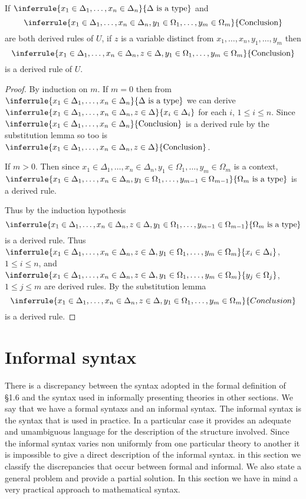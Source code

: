 \begin{lemma}[4]
If $\inferrule{x_1\in\Delta_1,\ldots,x_n\in\Delta_n}{\Delta\isatype}$ and 
\[\inferrule{x_1\in\Delta_1,\ldots,x_n\in\Delta_n,y_1\in\Omega_1,\ldots,y_m\in\Omega_m}{\text{Conclusion}}\] are both derived rules of $U$, if $z$ is a variable distinct from $x_1,\ldots,x_n,y_1,\ldots,y_m$ then 
\[\inferrule{x_1\in\Delta_1,\ldots,x_n\in\Delta_n,z\in\Delta,y_1\in\Omega_1,\ldots,y_m\in\Omega_m}{\text{Conclusion}}\] is a derived rule of $U$.
\end{lemma}
\begin{proof}
  By induction on $m$.
  If $m=0$ then from $\inferrule{x_1\in\Delta_1,\ldots,x_n\in\Delta_n}{\Delta\isatype}$ we can derive $\inferrule{x_1\in\Delta_1,\ldots,x_n\in\Delta_n,z\in\Delta}{x_i\in\Delta_i}$ for each $i$, $1\leq i\leq n$.
  Since $\inferrule{x_1\in\Delta_1,\ldots,x_n\in\Delta_n}{\text{Conclusion}}$ is a derived rule by the substitution lemma so too is $\inferrule{x_1\in\Delta_1,\ldots,x_n\in\Delta_n,z\in\Delta}{\text{Conclusion}}$.


  If $m>0$.
  Then since $x_1\in\Delta_1,\ldots,x_n\in\Delta_n, y_1\in\Omega_1,\ldots,y_m\in\Omega_m$ is a context, $\inferrule{x_1\in\Delta_1,\ldots,x_n\in\Delta_n,y_1\in\Omega_1,\ldots,y_{m-1}\in\Omega_{m-1}}{\Omega_m\isatype}$ is a derived rule.


  Thus by the induction hypothesis 
  \[\inferrule{x_1\in\Delta_1,\ldots,x_n\in\Delta_n,z\in\Delta,y_1\in\Omega_1,\ldots,y_{m-1}\in\Omega_{m-1}}{\Omega_m\isatype}\] is a derived rule.
%
  Thus $\inferrule{x_1\in\Delta_1,\ldots,x_n\in\Delta_n,z\in\Delta,y_1\in\Omega_1,\ldots,y_m\in\Omega_m}{x_i\in\Delta_i}$, $1\leq i\leq n$, and $\inferrule{x_1\in\Delta_1,\ldots,x_n\in\Delta_n,z\in\Delta,y_1\in\Omega_1,\ldots,y_m\in\Omega_m}{y_j\in\Omega_j}$, $1\leq j\leq m$ are derived rules.
  By the substitution lemma 
  \[\inferrule{x_1\in\Delta_1,\ldots,x_n\in\Delta_n,z\in\Delta,y_1\in\Omega_1,\ldots,y_m\in\Omega_m}{Conclusion}\] is a derived rule.
\end{proof}




\section{Informal syntax} \label{sec:source-1-8}

There is a discrepancy between the syntax adopted in the formal definition of \S 1.6 and the syntax used in informally presenting theories in other sections. We say that we have a formal syntaxs and an informal syntax.
%
The informal syntax is the syntax that is used in practice. In a particular case it provides an adequate and umambiguous language for the description of the structure involved.
%
Since the informal syntax varies non uniformly from one particular theory to another it is impossible to give a direct description of the informal syntax. in this section we classify the discrepancies that occur between formal and informal.
%
We also state a general problem and provide a partial solution.
%
In this section we have in mind a very practical approach to mathematical syntax.

